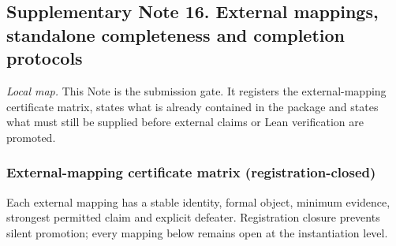 \hypertarget{supplementary-note-16.-external-mappings-standalone-completeness-and-completion-protocols}{%
\subsection{Supplementary Note 16. External mappings, standalone
completeness and completion
protocols}\label{supplementary-note-16.-external-mappings-standalone-completeness-and-completion-protocols}}

\emph{Local map.} This Note is the submission gate. It registers the
external-mapping certificate matrix, states what is already contained in
the package and states what must still be supplied before external
claims or Lean verification are promoted.

\hypertarget{external-mapping-certificate-matrix-registration-closed}{%
\subsubsection{External-mapping certificate matrix
(registration-closed)}\label{external-mapping-certificate-matrix-registration-closed}}

Each external mapping has a stable identity, formal object, minimum
evidence, strongest permitted claim and explicit defeater. Registration
closure prevents silent promotion; every mapping below remains open at
the instantiation level.

